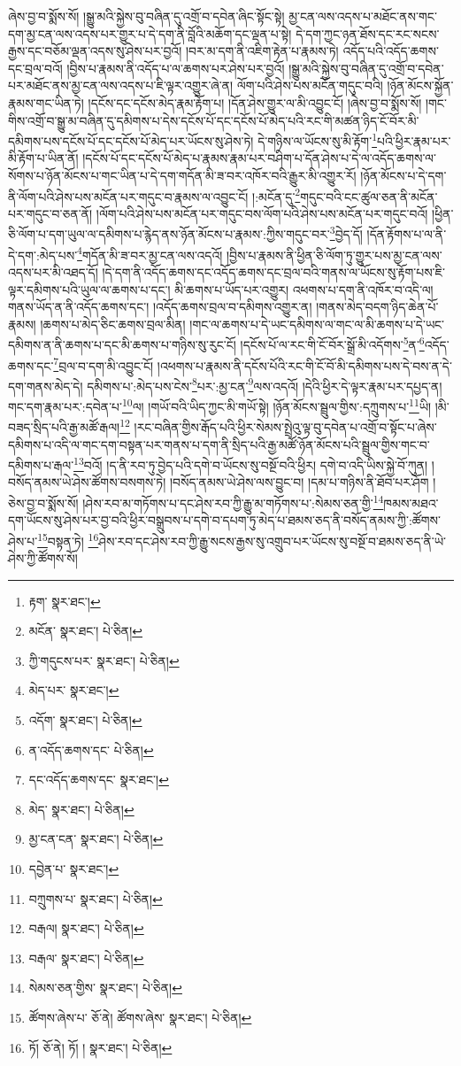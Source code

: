 ཞེས་བྱ་བ་སྨོས་སོ། །སྒྱུ་མའི་སྐྱེས་བུ་བཞིན་དུ་འགྲོ་བ་དབེན་ཞིང་སྟོང་སྟེ། མྱ་ངན་ལས་འདས་པ་མཐོང་ནས་གང་དག་མྱ་ངན་ལས་འདས་པར་གྱུར་པ་དེ་དག་ནི་བློའི་མཆོག་དང་ལྡན་པ་སྟེ། དེ་དག་ཀྱང་ཉན་ཐོས་དང་རང་སངས་རྒྱས་དང་བཅོམ་ལྡན་འདས་སུ་ཤེས་པར་བྱའོ། །བར་མ་དག་ནི་འཇིག་རྟེན་པ་རྣམས་ཏེ། འདོད་པའི་འདོད་ཆགས་དང་བྲལ་བའོ། །བྱིས་པ་རྣམས་ནི་འདོད་པ་ལ་ཆགས་པར་ཤེས་པར་བྱའོ། །སྒྱུ་མའི་སྐྱེས་བུ་བཞིན་དུ་འགྲོ་བ་དབེན་པར་མཐོང་ནས་མྱ་ངན་ལས་འདས་པ་ཇི་ལྟར་འགྱུར་ཞེ་ན། ལོག་པའི་ཤེས་པས་མངོན་གདུང་བའི། །ཉོན་མོངས་སྐྱོན་རྣམས་གང་ཡིན་ཏེ། །དངོས་དང་དངོས་མེད་རྣམ་རྟོག་པ། །དོན་ཤེས་གྱུར་ལ་མི་འབྱུང་ངོ། །ཞེས་བྱ་བ་སྨོས་སོ། །གང་གིས་འགྲོ་བ་སྒྱུ་མ་བཞིན་དུ་དམིགས་པ་དེས་དངོས་པོ་དང་དངོས་པོ་མེད་པའི་རང་གི་མཚན་ཉིད་ངོ་བོར་མི་དམིགས་པས་དངོས་པོ་དང་དངོས་པོ་མེད་པར་ཡོངས་སུ་ཤེས་ཏེ། དེ་གཉིས་ལ་ཡོངས་སུ་མི་རྟོག་\footnote{རྟག་  སྣར་ཐང་། }པའི་ཕྱིར་རྣམ་པར་མི་རྟོག་པ་ཡིན་ནོ། །དངོས་པོ་དང་དངོས་པོ་མེད་པ་རྣམས་རྣམ་པར་བཤིག་པ་དོན་ཤེས་པ་དེ་ལ་འདོད་ཆགས་ལ་སོགས་པ་ཉོན་མོངས་པ་གང་ཡིན་པ་དེ་དག་གདོན་མི་ཟ་བར་འཁོར་བའི་རྒྱུར་མི་འགྱུར་རོ། །ཉོན་མོངས་པ་དེ་དག་ནི་ལོག་པའི་ཤེས་པས་མངོན་པར་གདུང་བ་རྣམས་ལ་འབྱུང་ངོ། །:མངོན་དུ་\footnote{མངོན་  སྣར་ཐང་།  པེ་ཅིན། }གདུང་བའི་ངང་ཚུལ་ཅན་ནི་མངོན་པར་གདུང་བ་ཅན་ནོ། །ལོག་པའི་ཤེས་པས་མངོན་པར་གདུང་བས་ལོག་པའི་ཤེས་པས་མངོན་པར་གདུང་བའོ། །ཕྱིན་ཅི་ལོག་པ་དག་ཡུལ་ལ་དམིགས་པ་རྙེད་ནས་ཉོན་མོངས་པ་རྣམས་:ཀྱིས་གདུང་བར་\footnote{ཀྱི་གདུངས་པར་  སྣར་ཐང་།  པེ་ཅིན། }བྱེད་དོ། །དོན་རྟོགས་པ་ལ་ནི་དེ་དག་:མེད་པས་\footnote{མེད་པར་  སྣར་ཐང་། }གདོན་མི་ཟ་བར་མྱ་ངན་ལས་འདའོ། །བྱིས་པ་རྣམས་ནི་ཕྱིན་ཅི་ལོག་ཏུ་གྱུར་པས་མྱ་ངན་ལས་འདས་པར་མི་འཐད་དོ། །དེ་དག་ནི་འདོད་ཆགས་དང་འདོད་ཆགས་དང་བྲལ་བའི་གནས་ལ་ཡོངས་སུ་རྟོག་པས་ཇི་ལྟར་དམིགས་པའི་ཡུལ་ལ་ཆགས་པ་དང་། མི་ཆགས་པ་ཡོད་པར་འགྱུར། འཕགས་པ་དག་ནི་འཁོར་བ་འདི་ལ། གནས་ཡོད་ན་ནི་འདོད་ཆགས་དང་། །འདོད་ཆགས་བྲལ་བ་དམིགས་འགྱུར་ན། །གནས་མེད་བདག་ཉིད་ཆེན་པོ་རྣམས། །ཆགས་པ་མེད་ཅིང་ཆགས་བྲལ་མིན། །གང་ལ་ཆགས་པ་དེ་ཡང་དམིགས་ལ་གང་ལ་མི་ཆགས་པ་དེ་ཡང་དམིགས་ན་ནི་ཆགས་པ་དང་མི་ཆགས་པ་གཉིས་སུ་རུང་ངོ། །དངོས་པོ་ལ་རང་གི་ངོ་བོར་སྒྲོ་མི་འདོགས་\footnote{འདོག་  སྣར་ཐང་།  པེ་ཅིན། }ན་\footnote{ན་འདོད་ཆགས་དང་  པེ་ཅིན། }འདོད་ཆགས་དང་\footnote{དང་འདོད་ཆགས་དང་  སྣར་ཐང་། }བྲལ་བ་དག་མི་འབྱུང་ངོ། །འཕགས་པ་རྣམས་ནི་དངོས་པོའི་རང་གི་ངོ་བོ་མི་དམིགས་པས་དེ་བས་ན་དེ་དག་གནས་མེད་དེ། དམིགས་པ་:མེད་པས་ངེས་\footnote{མེད་  སྣར་ཐང་།  པེ་ཅིན། }པར་:མྱ་ངན་\footnote{མྱ་ངན་ངན་  སྣར་ཐང་།  པེ་ཅིན། }ལས་འདའོ། །དེའི་ཕྱིར་དེ་ལྟར་རྣམ་པར་དཔྱད་ན། གང་དག་རྣམ་པར་:དབེན་པ་\footnote{དབྱེན་པ་  སྣར་ཐང་། }ལ། །གཡོ་བའི་ཡིད་ཀྱང་མི་གཡོ་སྟེ། །ཉོན་མོངས་སྦྲུལ་གྱིས་:དཀྲུགས་པ་\footnote{བཀྲུགས་པ་  སྣར་ཐང་།  པེ་ཅིན། }ཡི། །མི་བཟད་སྲིད་པའི་རྒྱ་མཚོ་རྒལ།\footnote{བརྒལ།  སྣར་ཐང་།  པེ་ཅིན། } །རང་བཞིན་གྱིས་རྒོད་པའི་ཕྱིར་སེམས་སྤྲེའུ་ལྟ་བུ་དབེན་པ་འགྲོ་བ་སྟོང་པ་ཞེས་དམིགས་པ་འདི་ལ་གང་དག་བསྟན་པར་གནས་པ་དག་ནི་སྲིད་པའི་རྒྱ་མཚོ་ཉོན་མོངས་པའི་སྦྲུལ་གྱིས་གང་བ་དམིགས་པ་རྒལ་\footnote{བརྒལ་  སྣར་ཐང་།  པེ་ཅིན། }བའོ། །ད་ནི་རབ་ཏུ་བྱེད་པའི་དགེ་བ་ཡོངས་སུ་བསྔོ་བའི་ཕྱིར། དགེ་བ་འདི་ཡིས་སྐྱེ་བོ་ཀུན། །བསོད་ནམས་ཡེ་ཤེས་ཚོགས་བསགས་ཏེ། །བསོད་ནམས་ཡེ་ཤེས་ལས་བྱུང་བ། །དམ་པ་གཉིས་ནི་ཐོབ་པར་ཤོག །ཅེས་བྱ་བ་སྨོས་སོ། །ཤེས་རབ་མ་གཏོགས་པ་དང་ཤེས་རབ་ཀྱི་རྒྱུ་མ་གཏོགས་པ་:སེམས་ཅན་གྱི་\footnote{སེམས་ཅན་གྱིས་  སྣར་ཐང་།  པེ་ཅིན། }ཁམས་མཐའ་དག་ཡོངས་སུ་ཤེས་པར་བྱ་བའི་ཕྱིར་བསྒྲུབས་པ་དགེ་བ་དཔག་ཏུ་མེད་པ་ཐམས་ཅད་ནི་བསོད་ནམས་ཀྱི་:ཚོགས་ཤེས་པ་\footnote{ཚོགས་ཞེས་པ་  ཅོ་ནེ། ཚོགས་ཞེས་  སྣར་ཐང་།  པེ་ཅིན། }བསྟན་ཏེ། \footnote{ཏོ།   ཅོ་ནེ། ཏོ། །   སྣར་ཐང་།  པེ་ཅིན། }ཤེས་རབ་དང་ཤེས་རབ་ཀྱི་རྒྱུ་སངས་རྒྱས་སུ་འགྲུབ་པར་ཡོངས་སུ་བསྔོ་བ་ཐམས་ཅད་ནི་ཡེ་ཤེས་ཀྱི་ཚོགས་སོ། 